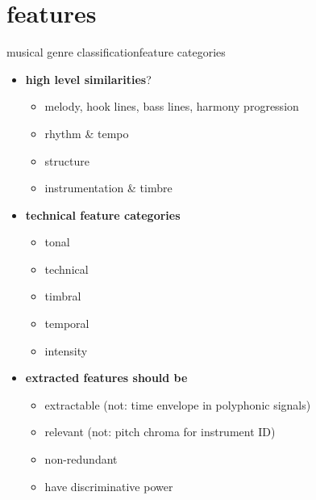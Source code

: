     \section{features}
        \begin{frame}{musical genre classification}{feature categories}
            \vspace{-3mm}
            \begin{itemize}
                \item	\textbf{high level similarities}?
                    \begin{itemize}
                        \item	melody, hook lines, bass lines, harmony progression
                        \item	rhythm \& tempo
                        \item	structure
                        \item	instrumentation \& timbre
                    \end{itemize}
                \smallskip
                \item<2->	\textbf{technical feature categories}
                    \begin{itemize}
                        \item	tonal
                        \item	technical
                        \item	timbral
                        \item	temporal
                        \item	intensity
                    \end{itemize}
                \smallskip
                \item<3->       \textbf{extracted features should be}
                    \begin{itemize}
                        \item   extractable (not: time envelope in polyphonic signals)
                        \item   relevant (not: pitch chroma for instrument ID)
                        \item   non-redundant
                        \item   have discriminative power
                    \end{itemize}
            \end{itemize}
        \end{frame}

